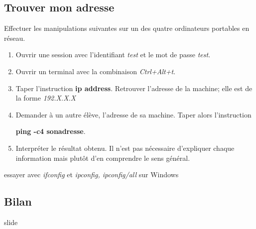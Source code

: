 \documentclass[a4paper,11pt]{article}
\begin{document}
\begin{Form}
\subsection{Trouver mon adresse}
Effectuer les manipulations suivantes sur un des quatre ordinateurs portables en réseau.
\begin{enumerate}
\item Ouvrir une session avec l'identifiant \emph{test} et le mot de passe \emph{test}.
\item Ouvrir un terminal avec la combinaison \emph{Ctrl+Alt+t}.
\item Taper l'instruction \textbf{ip address}. Retrouver l'adresse de la machine; elle est de la forme \emph{192.X.X.X}
\item Demander à un autre élève, l'adresse de sa machine. Taper alors l'instruction \begin{center}\textbf{ping -c4 sonadresse}.\end{center}
\item Interpréter le résultat obtenu. Il n'est pas nécessaire d'expliquer chaque information mais plutôt d'en comprendre le sens général.
\end{enumerate}
\begin{commentprof}
essayer avec \emph{ifconfig} et \emph{ipconfig, ipconfig/all} sur Windows
\end{commentprof}
\begin{commentprof}
\section*{Bilan}
slide
\end{commentprof}
\end{Form}
\end{document}
